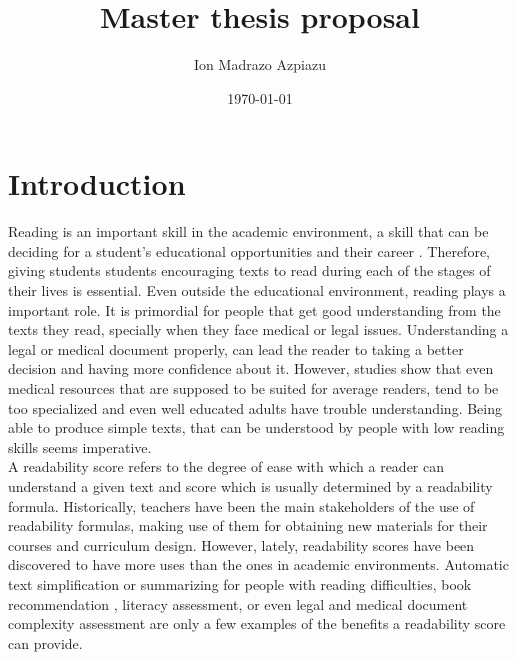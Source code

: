 \documentclass[12pt]{article}
\title{Master thesis proposal}
\author{Ion Madrazo Azpiazu}
\date{\today}
\begin{document}
\maketitle
\section{Introduction}

Reading is an important skill in the academic environment, a skill that can be deciding for a student's educational opportunities and their career \cite{robinson2000issues}. Therefore, giving students students encouraging texts to read during each of the stages of their lives is essential. Even outside the educational environment, reading plays a important role. It is primordial for people that get good understanding from the texts they read, specially when they face medical or legal issues. Understanding a legal or medical document properly, can lead the reader to taking a better decision and having more confidence about  it. However, studies\cite{medicalReadability1}\cite{medicalReadability2}\cite{medicalReadability3} show that even medical resources that are supposed to be suited for average readers, tend to be too specialized and even well educated adults have trouble understanding. Being able to produce simple texts, that can be understood by people with low reading skills seems imperative.\\



A readability score refers to the degree of ease with which a reader can understand a given text and score which is usually determined by a readability formula. Historically, teachers have been the main stakeholders of the use of readability formulas, making use of them for obtaining new materials for their courses and curriculum design. However, lately, readability scores have been discovered to have more uses than the ones in academic environments. Automatic text simplification\cite{textsimplification1}\cite{textsimplification2} or summarizing for people with reading difficulties\cite{textsimplificationWithDisabilities1}, book recommendation \cite{pera2014automating}, literacy assessment\cite{literacy1}, or even legal\cite{legalreadability} and medical document complexity assessment\cite{medicalReadability1}\cite{medicalReadability2}\cite{medicalReadability3} are only a few examples of the benefits a readability score can provide.\\
\end{document}
